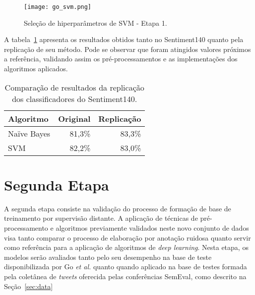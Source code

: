 \begin{figure}
\begin{center} {
    \begin{center}
    \texttt{[image: go\_svm.png]}
    \caption{Seleção de hiperparâmetros de SVM - Etapa 1.}
    \label{fig:go_svm}
    \end{center}
}
\end{center}
\end{figure}

A tabela~\ref{tab:go_compara} apresenta os resultados obtidos tanto no Sentiment140 quanto pela replicação de
seu método.
Pode se observar que foram atingidos valores próximos a referência, validando assim os pré-processamentos e as
implementações dos algoritmos aplicados.

\begin{table}[h]
    \begin{center}
        \begin{tabular}{| l | r | r |}
        \hline
        \textbf{Algoritmo} & \textbf{Original} & \textbf{Replicação} \\ \hline
        Naïve Bayes & 81,3\% & 83,3\% \\ \hline
        SVM &  82,2\% & 83,0\% \\ \hline
        \end{tabular}
        \caption{Comparação de resultados da replicação dos classificadores do Sentiment140.}
        \label{tab:go_compara}
    \end{center}
\end{table}

\section{Segunda Etapa}

A segunda etapa consiste na validação do processo de formação de base de treinamento por supervisão distante.
A aplicação de técnicas de pré-processamento e algoritmos previamente validados neste novo conjunto de dados visa tanto
comparar o processo de elaboração por anotação ruidosa quanto servir como referência para a aplicação de algoritmos de
\textit{deep learning}.
Nesta etapa, os modelos serão avaliados tanto pelo seu desempenho na base de teste disponibilizada por Go
\textit{et al.} quanto quando aplicado na base de testes formada pela coletânea de \textit{tweets} oferecida pelas
conferências SemEval, como descrito na Seção~\ref{sec:data}

